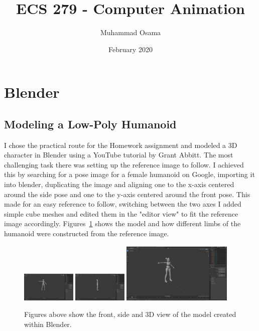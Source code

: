 \documentclass[acmtog]{acmart}
\title{ECS 279 - Computer Animation}
\author{Muhammad Osama}
\date{February 2020}
\begin{document}
\maketitle

\section{Blender}
\subsection{Modeling a Low-Poly Humanoid}
I chose the practical route for the Homework assignment and modeled a 3D character in Blender using a YouTube tutorial by Grant Abbitt\cite{Blender:Modeling:Tutorial}. The most challenging task there was setting up the reference image to follow. I achieved this by searching for a pose image for a female humanoid on Google, importing it into blender, duplicating the image and aligning one to the x-axis centered around the side pose and one to the y-axis centered around the front pose. This made for an easy reference to follow, switching between the two axes I added simple cube meshes and edited them in the "editor view" to fit the reference image accordingly. Figures~\ref{fig:model} shows the model and how different limbs of the humanoid were constructed from the reference image.

\begin{figure}[ht]
  \centering
  \includegraphics[width=0.23\textwidth]{images/Model_Front.png}
  \includegraphics[width=0.23\textwidth]{images/Model_Side.png}
  \includegraphics[width=0.47\textwidth]{images/Model_3D.png}
  \caption{Figures above show the front, side and 3D view of the model created within Blender.}  \label{fig:model}
\end{figure}
\end{document}
